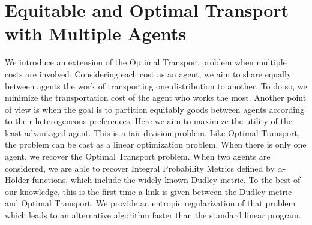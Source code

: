 \chapter{Equitable and Optimal Transport with Multiple Agents}
\label{paper:eot}
We introduce an extension of the Optimal Transport problem when multiple costs are involved. Considering each cost as an agent, we aim to share equally between agents the work of transporting one distribution to another. To do so, we minimize the transportation cost of the agent who works the most. Another point of view is when the goal is to partition equitably goods between agents according to their heterogeneous preferences. Here we aim to maximize the utility of the least advantaged agent. This is a fair division problem. Like Optimal Transport, the problem can be cast as a linear optimization problem. When there is only one agent, we recover the Optimal Transport problem. When two agents are considered, we are able to recover Integral Probability Metrics defined by $\alpha$-Hölder functions, which include the widely-known Dudley metric. To the best of our knowledge, this is the first time a link is given between the Dudley metric and Optimal Transport. We provide an entropic regularization of that problem which leads to an alternative algorithm faster than the standard linear program. 







%
%



